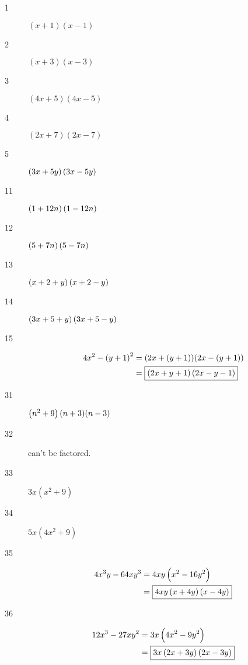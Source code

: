 \documentclass[letterpaper, landscape]{exam}
\begin{document}
    \begin{description}
      \item[1] $(x + 1)(x - 1)$

      \item[2] $(x + 3)(x - 3)$

      \item[3] $(4x + 5)(4x - 5)$

      \item[4] $(2x + 7)(2x - 7)$

      \item[5] $\del{3x + 5y} \del{3x - 5y}$

      \item[11] $\del{1 + 12n} \del{1 - 12n}$

      \item[12] $\del{5 + 7n} \del{5 - 7n}$

      \item[13] $\del{x + 2 + y} \del{x + 2 - y}$

      \item[14] $\del{3x + 5 + y} \del{3x + 5 - y}$

      \item[15] 
        \begin{align*}
          4x^2 - \del{y + 1}^2 & = (2x + (y + 1))(2x - (y + 1)) \\
                               & = \boxed{ (2x + y + 1) \del{2x - y - 1} } \\
        \end{align*}

      \item[31] $\del{n^2 + 9} (n + 3)(n - 3)$

      \item[32] can't be factored.

      \item[33] $3x(x^2 + 9)$

      \item[34] $5x(4x^2 + 9)$

      \item[35] 
        \begin{align*}
          4x^3y - 64xy^3 & = 4xy \del{ x^2 - 16y^2 } \\
                         & = \boxed{ 4xy \del{x + 4y} \del{x - 4y} } \\
        \end{align*}

      \item[36] 
        \begin{align*}
          12x^3 - 27xy^2 & = 3x \del{ 4x^2 - 9y^2 } \\
                         & = \boxed{ 3x \del{2x + 3y} \del{2x - 3y} } \\
        \end{align*}


\end{description}
\end{document}
